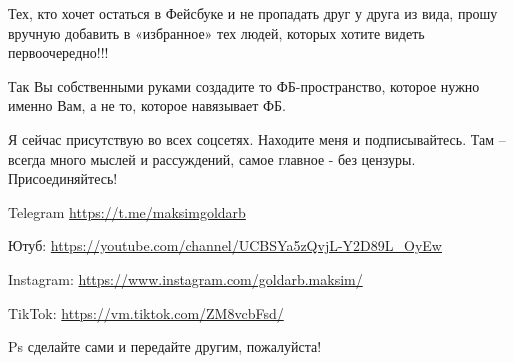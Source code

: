 Тех, кто хочет остаться в Фейсбуке и не пропадать друг у друга из вида, прошу
вручную добавить в «избранное» тех людей, которых хотите видеть
первоочередно!!! 

Так Вы собственными руками создадите то ФБ-пространство, которое нужно именно
Вам, а не то, которое навязывает ФБ.

Я сейчас присутствую во всех соцсетях. Находите меня и подписывайтесь. Там –
всегда много мыслей и рассуждений, самое главное - без цензуры.
Присоединяйтесь!

Telegram \url{https://t.me/maksimgoldarb} 

Ютуб: \url{https://youtube.com/channel/UCBSYa5zQvjL-Y2D89L_OyEw}  

Instagram: \url{https://www.instagram.com/goldarb.maksim/} 

TikTok: \url{https://vm.tiktok.com/ZM8vcbFsd/}

Ps сделайте сами и передайте другим, пожалуйста!
